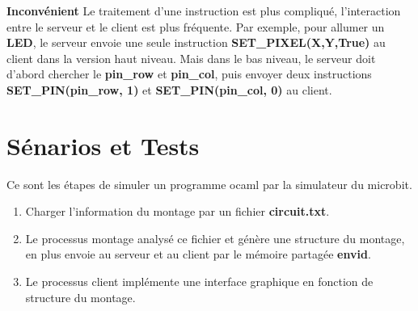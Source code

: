 \documentclass[14px]{article}
\begin{document}
\textbf{Inconvénient}
Le traitement d'une instruction est plus compliqué, l'interaction entre le serveur et le client est plus fréquente. Par exemple, pour allumer un \textbf{LED}, le serveur envoie une seule instruction \textbf{SET\_PIXEL(X,Y,True)} au client dans la version haut niveau. Mais dans le bas niveau, le serveur doit d'abord chercher le \textbf{pin\_row} et \textbf{pin\_col}, puis envoyer deux instructions \textbf{SET\_PIN(pin\_row, 1)} et \textbf{SET\_PIN(pin\_col, 0)} au client.

\clearpage

\section{Sénarios et Tests}
Ce sont les étapes de simuler un programme ocaml par la simulateur du microbit.
\begin{enumerate}
    \item Charger l'information du montage par un fichier \textbf{circuit.txt}.
    \item Le processus montage analysé ce fichier et génère une structure du montage, en plus envoie au serveur et au client par le mémoire partagée \textbf{envid}.
    \item Le processus client implémente une interface graphique en fonction de structure du montage.
    \begin{figure}[htbp]
        \centering
\end{figure}
\end{enumerate}
\end{document}
